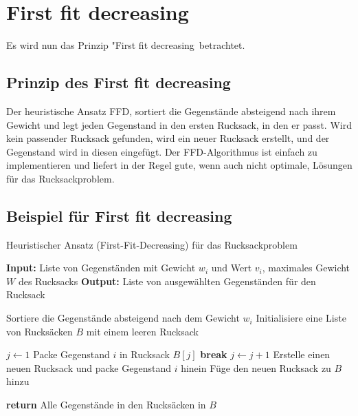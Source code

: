 \documentclass[12pt]{report}
\begin{document}
\newpage
\chapter{First fit decreasing}
Es wird nun das Prinzip "First fit decreasing\dq \, betrachtet.
\section{Prinzip des First fit decreasing}
Der heuristische Ansatz \ac{FFD}, sortiert die Gegenstände absteigend nach ihrem Gewicht und legt jeden Gegenstand in den ersten Rucksack, in den er passt. Wird kein passender Rucksack gefunden, wird ein neuer Rucksack erstellt, und der Gegenstand wird in diesen eingefügt. Der \ac{FFD}-Algorithmus ist einfach zu implementieren und liefert in der Regel gute, wenn auch nicht optimale, Lösungen für das Rucksackproblem. \cite{martello1987algorithms}

\section{Beispiel für First fit decreasing}
\begin{algorithm}
	\caption{Heuristischer Ansatz (First-Fit-Decreasing) für das Rucksackproblem}
	\begin{algorithmic}[1]
		\State \textbf{Input:} Liste von Gegenständen mit Gewicht $w_i$ und Wert $v_i$, maximales Gewicht $W$ des Rucksacks
		\State \textbf{Output:} Liste von ausgewählten Gegenständen für den Rucksack
		
		\State Sortiere die Gegenstände absteigend nach dem Gewicht $w_i$
		\State Initialisiere eine Liste von Rucksäcken $B$ mit einem leeren Rucksack
		
		\State $j \gets 1$
		\State Packe Gegenstand $i$ in Rucksack $B[j]$
		\State \textbf{break}
		\EndIf
		\State $j \gets j + 1$
		\EndWhile
		\State Erstelle einen neuen Rucksack und packe Gegenstand $i$ hinein
		\State Füge den neuen Rucksack zu $B$ hinzu
		\EndIf
		\EndFor
		
		\State \textbf{return} Alle Gegenstände in den Rucksäcken in $B$
	\end{algorithmic}
\end{algorithm}

\end{document}
